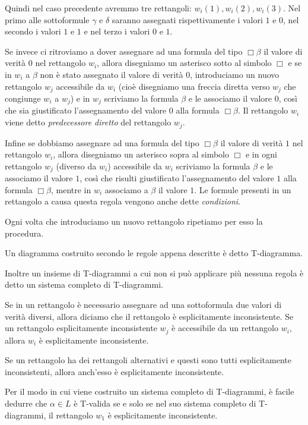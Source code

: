 \documentclass[a4paper, titlepage, 12pt]{report}
\begin{document}
Quindi nel caso precedente avremmo tre rettangoli: $w_i(1), w_i(2), w_i(3)$.
Nel primo alle sottoformule $\gamma$ e $\delta$ saranno assegnati rispettivamente i valori $1$ e $0$,
nel secondo i valori $1$ e $1$ e nel terzo i valori $0$ e $1$.

Se invece ci ritroviamo a dover assegnare ad una formula del tipo $\Box \beta$
il valore di verità $0$ nel rettangolo $w_i$, allora disegniamo un asterisco sotto al simbolo $\Box$
e se in $w_i$ a $\beta$ non è stato assegnato il valore di verità $0$,
introduciamo un nuovo rettangolo $w_j$ accessibile da $w_i$ (cioè disegniamo una freccia diretta verso $w_j$ che congiunge $w_i$ a $w_j$)
e in $w_j$ scriviamo la formula $\beta$ e le associamo il valore $0$, così che sia giustificato
l'assegnamento del valore $0$ alla formula $\Box \beta$.
Il rettangolo $w_i$ viene detto \emph{predecessore diretto} del rettangolo $w_j$.

Infine se dobbiamo assegnare ad una formula del tipo $\Box \beta$
il valore di verità $1$ nel rettangolo $w_i$, allora disegniamo un asterisco sopra al simbolo $\Box$
e in ogni rettangolo $w_j$ (diverso da $w_i$)  accessibile da $w_i$ scriviamo la formula $\beta$ e le associamo il valore $1$,
così che risulti giustificato l'assegnamento del valore $1$ alla formula $\Box \beta$,
mentre in $w_i$ associamo a $\beta$ il valore $1$.
Le formule presenti in un rettangolo a causa questa regola vengono anche dette \emph{condizioni}.

Ogni volta che introduciamo un nuovo rettangolo ripetiamo per esso la procedura.

Un diagramma costruito secondo le regole appena descritte è detto T-diagramma.

Inoltre un insieme di T-diagrammi a cui non si può applicare più nessuna regola è detto
un sistema completo di T-diagrammi.

Se in un rettangolo è necessario assegnare ad una sottoformula due valori di verità diversi,
allora diciamo che il rettangolo è esplicitamente inconsistente.
Se un rettangolo esplicitamente inconsistente $w_j$ è accessibile da un rettangolo $w_i$,
allora $w_i$ è esplicitamente inconsistente.

Se un rettangolo ha dei rettangoli alternativi e questi sono tutti esplicitamente inconsistenti,
allora anch'esso è esplicitamente inconsistente.

Per il modo in cui viene costruito un sistema completo di T-diagrammi, è facile dedurre che
$\alpha \in L$ è T-valida se e solo se nel suo sistema completo di T-diagrammi, il rettangolo
$w_1$ è esplicitamente inconsistente.
\end{document}
